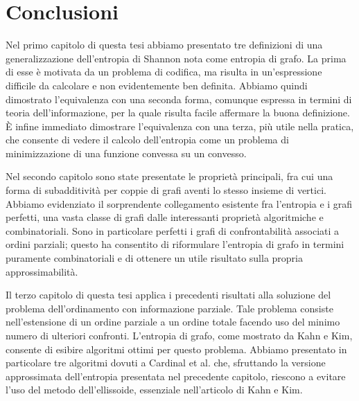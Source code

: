 \chapter{Conclusioni}
Nel primo capitolo di questa tesi abbiamo presentato tre definizioni di una 
generalizzazione dell'entropia di Shannon nota come entropia di grafo. La 
prima di esse è motivata da un problema di codifica, ma risulta in 
un'espressione difficile da calcolare e non evidentemente ben definita. 
Abbiamo quindi dimostrato l'equivalenza con una seconda forma, comunque 
espressa in termini di teoria dell'informazione, per la quale risulta facile 
affermare la buona definizione. È infine immediato dimostrare l'equivalenza 
con una terza, più utile nella pratica, che consente di vedere il calcolo 
dell'entropia come un problema di minimizzazione di una funzione convessa su 
un convesso.

Nel secondo capitolo sono state presentate le proprietà principali, fra cui
una forma di subadditività per coppie di grafi aventi lo stesso insieme di
vertici. Abbiamo evidenziato il sorprendente collegamento esistente fra
l'entropia e i grafi perfetti, una vasta classe di grafi dalle interessanti
proprietà algoritmiche e combinatoriali. Sono in particolare perfetti i grafi
di confrontabilità associati a ordini parziali; questo ha consentito di
riformulare l'entropia di grafo in termini puramente combinatoriali e di
ottenere un utile risultato sulla propria approssimabilità.

Il terzo capitolo di questa tesi applica i precedenti risultati alla
soluzione del problema dell'ordinamento con informazione parziale. Tale
problema consiste nell'estensione di un ordine parziale a un ordine totale
facendo uso del minimo numero di ulteriori confronti. L'entropia di grafo,
come mostrato da Kahn e Kim, consente di esibire algoritmi ottimi per questo 
problema. Abbiamo presentato in particolare tre algoritmi dovuti a Cardinal et
al. che, sfruttando la versione approssimata dell'entropia presentata nel
precedente capitolo, riescono a evitare l'uso del metodo dell'ellissoide,
essenziale nell'articolo di Kahn e Kim.
